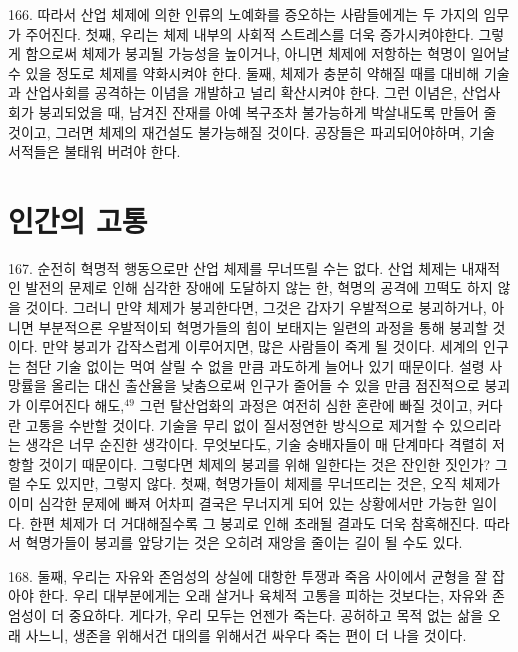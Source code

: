 \documentclass[11pt,a4paper]{article}
\begin{document}
\begin{multicols}{2}
166. 따라서 산업 체제에 의한 인류의 노예화를 증오하는 사람들에게는 두 가지의 임무가 주어진다.  첫째, 우리는 체제 내부의 사회적 스트레스를 더욱 증가시켜야한다. 그렇게 함으로써 체제가 붕괴될  가능성을 높이거나, 아니면 체제에 저항하는 혁명이 일어날 수 있을 정도로 체제를 약화시켜야 한다. 
둘째, 체제가 충분히 약해질 때를 대비해 기술과 산업사회를 공격하는 이념을 개발하고 널리 확산시켜야  한다. 그런 이념은, 산업사회가 붕괴되었을 때, 남겨진 잔재를 아예 복구조차 불가능하게 박살내도록  만들어 줄 것이고, 그러면 체제의 재건설도 불가능해질 것이다. 공장들은 파괴되어야하며, 기술 서적들은  불태워 버려야 한다.  


\section*{인간의 고통} 
167. 순전히 혁명적 행동으로만 산업 체제를 무너뜨릴 수는 없다. 산업 체제는 내재적인 발전의 문제로  인해 심각한 장애에 도달하지 않는 한, 혁명의 공격에 끄떡도 하지 않을 것이다. 그러니 만약 체제가  붕괴한다면, 그것은 갑자기 우발적으로 붕괴하거나, 아니면 부분적으론 우발적이되 혁명가들의 힘이  보태지는 일련의 과정을 통해 붕괴할 것이다. 만약 붕괴가 갑작스럽게 이루어지면, 많은 사람들이 죽게 될 것이다. 세계의 인구는 첨단 기술 없이는 먹여 살릴 수 없을 만큼 과도하게 늘어나 있기 때문이다. 설령 사망률을 올리는 대신 출산율을 낮춤으로써 인구가 줄어들 수 있을 만큼 점진적으로 붕괴가 이루어진다  해도,\hyperlink{49}{$^{49}$} 그런 탈산업화의 과정은 여전히 심한 혼란에 빠질 것이고, 커다란 고통을 수반할 것이다. 기술을  무리 없이 질서정연한 방식으로 제거할 수 있으리라는 생각은 너무 순진한 생각이다. 무엇보다도, 기술  숭배자들이 매 단계마다 격렬히 저항할 것이기 때문이다. 그렇다면 체제의 붕괴를 위해 일한다는 것은  잔인한 짓인가? 그럴 수도 있지만, 그렇지 않다. 첫째, 혁명가들이 체제를 무너뜨리는 것은, 오직 체제가  이미 심각한 문제에 빠져 어차피 결국은 무너지게 되어 있는 상황에서만 가능한 일이다. 한편 체제가 더 거대해질수록 그 붕괴로 인해 초래될 결과도 더욱 참혹해진다. 따라서 혁명가들이 붕괴를 앞당기는 것은 오히려 재앙을 줄이는 길이 될 수도 있다.  


168. 둘째, 우리는 자유와 존엄성의 상실에 대항한 투쟁과 죽음 사이에서 균형을 잘 잡아야 한다. 우리  대부분에게는 오래 살거나 육체적 고통을 피하는 것보다는, 자유와 존엄성이 더 중요하다. 게다가, 우리  모두는 언젠가 죽는다. 공허하고 목적 없는 삶을 오래 사느니, 생존을 위해서건 대의를 위해서건 싸우다  죽는 편이 더 나을 것이다.  



\end{multicols}
\end{document}

